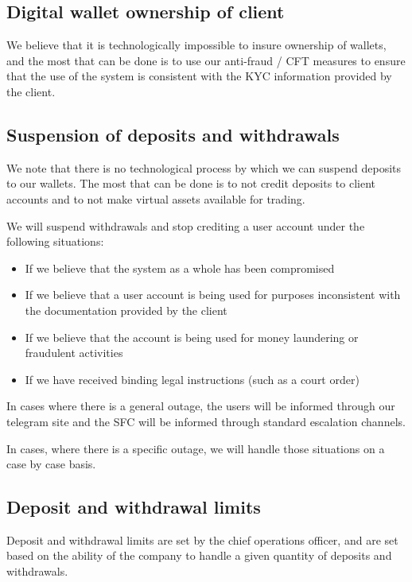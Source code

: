 \subsection{Digital wallet ownership of client}
We believe that it is technologically impossible to insure ownership
of wallets, and the most that can be done is to use our anti-fraud /
CFT measures to ensure that the use of the system is consistent with
the KYC information provided by the client.

\subsection{Suspension of deposits and withdrawals}
We note that there is no technological process by which we can suspend
deposits to our wallets.  The most that can be done is to not
credit deposits to client accounts and to not make virtual assets
available for trading.

We will suspend withdrawals and stop crediting a user account under
the following situations:
\begin{itemize}
\item If we believe that the system as a whole has been compromised
\item If we believe that a user account is being used for purposes
  inconsistent with the documentation provided by the client
\item If we believe that the account is being used for money
  laundering or fraudulent activities
\item If we have received binding legal instructions (such as a court order)
\end{itemize}

In cases where there is a general outage, the users will be informed
through our telegram site and the SFC will be informed through
standard escalation channels.

In cases, where there is a specific outage, we will handle those
situations on a case by case basis.

\subsection{Deposit and withdrawal limits}
Deposit and withdrawal limits are set by the chief operations officer,
and are set based on the ability of the company to handle a given
quantity of deposits and withdrawals.

